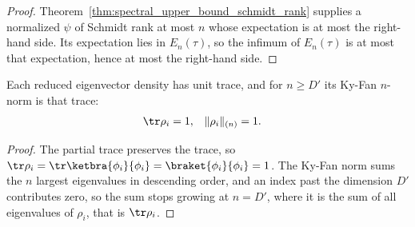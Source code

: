 \begin{proof}
    \leanok
    Theorem~\ref{thm:spectral_upper_bound_schmidt_rank} supplies a normalized
    $\psi$ of Schmidt rank at most $n$ whose expectation is at most the
    right-hand side. Its expectation lies in $E_n(\tau)$, so the infimum of
    $E_n(\tau)$ is at most that expectation, hence at most the right-hand side.
\end{proof}

\begin{lemma}
    \label{lem:reduced_eig_density_ky_fan_top}
    \leanok
    Each reduced eigenvector density has unit trace, and for $n\ge D'$ its
    Ky-Fan $n$-norm is that trace:
    \begin{align}
        \tr\rho_i &= 1,
        &
        \|\rho_i\|_{(n)} &= 1
        .
        \notag
    \end{align}
\end{lemma}

\begin{proof}
    \leanok
    The partial trace preserves the trace, so
    $\tr\rho_i=\tr\ketbra{\phi_i}{\phi_i}=\braket{\phi_i}{\phi_i}=1$. The Ky-Fan
    norm sums the $n$ largest eigenvalues in descending order, and an index past
    the dimension $D'$ contributes zero, so the sum stops growing at $n=D'$,
    where it is the sum of all eigenvalues of $\rho_i$, that is $\tr\rho_i$.
\end{proof}

